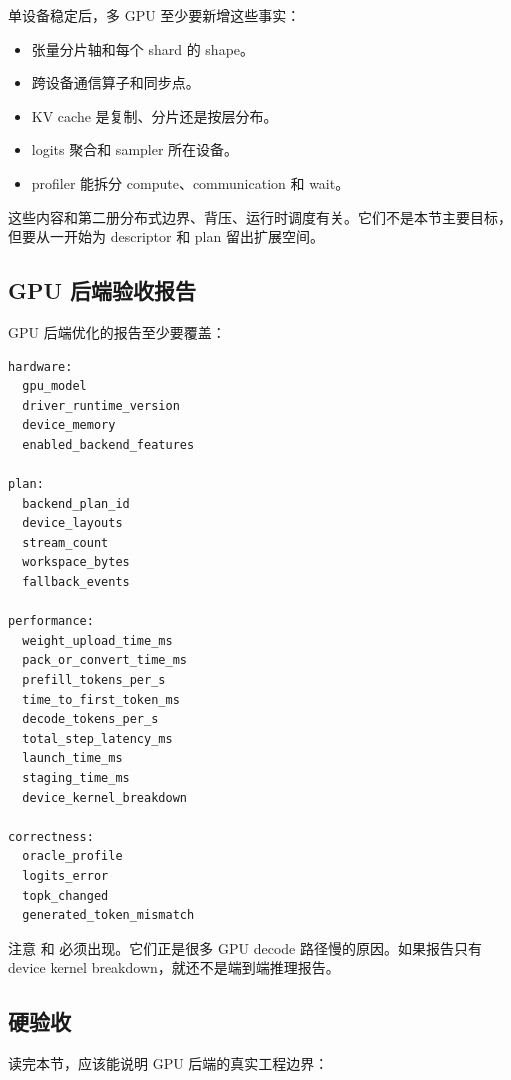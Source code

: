 单设备稳定后，多 GPU 至少要新增这些事实：

\begin{itemize}
  \item 张量分片轴和每个 shard 的 shape。
  \item 跨设备通信算子和同步点。
  \item KV cache 是复制、分片还是按层分布。
  \item logits 聚合和 sampler 所在设备。
  \item profiler 能拆分 compute、communication 和 wait。
\end{itemize}

这些内容和第二册分布式边界、背压、运行时调度有关。它们不是本节主要目标，但要从一开始为 descriptor 和 plan 留出扩展空间。

\subsection{GPU 后端验收报告}

GPU 后端优化的报告至少要覆盖：

\begin{lstlisting}[numbers=none,caption={GPU 后端验收报告字段}]
hardware:
  gpu_model
  driver_runtime_version
  device_memory
  enabled_backend_features

plan:
  backend_plan_id
  device_layouts
  stream_count
  workspace_bytes
  fallback_events

performance:
  weight_upload_time_ms
  pack_or_convert_time_ms
  prefill_tokens_per_s
  time_to_first_token_ms
  decode_tokens_per_s
  total_step_latency_ms
  launch_time_ms
  staging_time_ms
  device_kernel_breakdown

correctness:
  oracle_profile
  logits_error
  topk_changed
  generated_token_mismatch
\end{lstlisting}

注意  和  必须出现。它们正是很多 GPU decode 路径慢的原因。如果报告只有 device kernel breakdown，就还不是端到端推理报告。

\subsection{硬验收}

读完本节，应该能说明 GPU 后端的真实工程边界：

